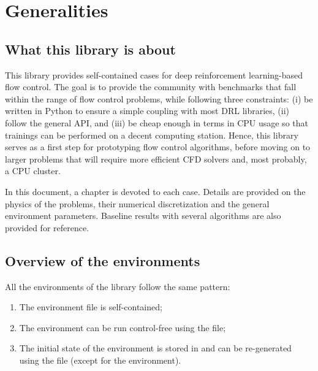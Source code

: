 \chapter{Generalities}

\section{What this library is about}

This library provides self-contained cases for deep reinforcement learning-based flow control. The goal is to provide the community with benchmarks that fall within the range of flow control problems, while following three constraints: (i) be written in Python to ensure a simple coupling with most DRL libraries, (ii) follow the general \gym API, and (iii) be cheap enough in terms in CPU usage so that trainings can be performed on a decent computing station. Hence, this library serves as a first step for prototyping flow control algorithms, before moving on to larger problems that will require more efficient CFD solvers and, most probably, a CPU cluster.

In this document, a chapter is devoted to each case. Details are provided on the physics of the problems, their numerical discretization and the general environment parameters. Baseline results with several algorithms are also provided for reference.

\section{Overview of the environments}

All the environments of the library follow the same pattern:

\begin{enumerate}[itemsep=0mm]
	\item The environment file is self-contained;
	\item The environment can be run control-free using the  file;
	\item The initial state of the environment is stored in  and can be re-generated using the  file (except for the  environment).
\end{enumerate}

